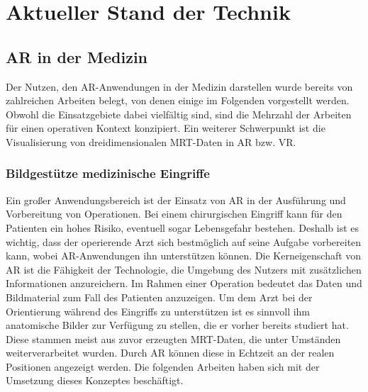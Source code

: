 
\chapter{Aktueller Stand der Technik}
\label{grundlagen}
\section{AR in der Medizin}												 %
 
Der Nutzen, den AR-Anwendungen in der Medizin darstellen wurde bereits von zahlreichen Arbeiten belegt, von denen einige im Folgenden vorgestellt werden. 
Obwohl die Einsatzgebiete dabei vielfältig sind, sind die Mehrzahl der Arbeiten für einen operativen Kontext konzipiert. Ein weiterer Schwerpunkt ist die Visualisierung von dreidimensionalen MRT-Daten in AR bzw. VR. %

\subsection{Bildgestütze medizinische Eingriffe}

Ein großer Anwendungsbereich ist der Einsatz von AR in der Ausführung und Vorbereitung von Operationen. Bei einem chirurgischen Eingriff kann für den Patienten ein hohes Risiko, eventuell sogar Lebensgefahr bestehen. Deshalb ist es wichtig, dass der operierende Arzt sich bestmöglich auf seine Aufgabe vorbereiten kann, wobei AR-Anwendungen ihn unterstützen können.
Die Kerneigenschaft von AR ist die Fähigkeit der Technologie, die Umgebung des Nutzers mit zusätzlichen Informationen anzureichern. Im Rahmen einer Operation bedeutet das Daten und Bildmaterial zum Fall des Patienten anzuzeigen. Um dem Arzt bei der Orientierung während des Eingriffs zu unterstützen ist es sinnvoll ihm anatomische Bilder zur Verfügung zu stellen, die er vorher bereits studiert hat. Diese stammen meist aus zuvor erzeugten MRT-Daten, die unter Umständen weiterverarbeitet wurden. Durch AR können diese in Echtzeit an der realen Positionen angezeigt werden. 
Die folgenden Arbeiten haben sich mit der Umsetzung dieses Konzeptes beschäftigt.


